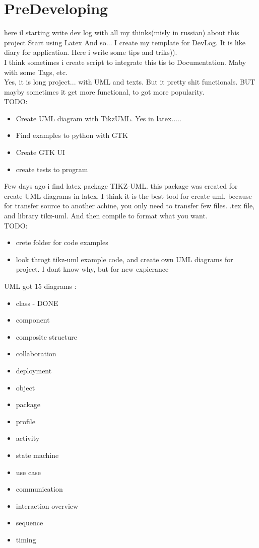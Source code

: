 \documentclass{article}
\begin{document}
\section{PreDeveloping}
\newpage
{}
here il starting write dev log with all my thinks(misly in russian) about this project
\newpage
{}
Start using Latex
And so... I create my template for DevLog. It is like diary for application. Here i write some tips and triks)).\\
I think sometimes i create script to integrate this tis to Documentation. Maby with some Tags, etc.\\
Yes, it is long project... with UML and texts. But it pretty shit functionals. BUT mayby sometimes it get more functional, to got more popularity.\\
TODO:
\begin{itemize}
  \item Create UML diagram with TikzUML. Yes in latex.....
  \item Find examples to python with GTK
  \item Create GTK UI
  \item create tests to program
\end{itemize}
\newpage
{}
Few days ago i find latex package TIKZ-UML. this package was created for create UML diagrams in latex. I think it is the best tool for create uml, because for transfer source to another achine, you only need to transfer few files. .tex file, and library tikz-uml. And then compile to format what you want.\\
TODO:
\begin{itemize}
  \item crete folder for code examples
  \item look throgt tikz-uml example code, and create own UML diagrams for project. I dont know why, but for new expierance
\end{itemize}
\newpage
{}
UML got 15 diagrams :\\
\begin{itemize}
  \item class - DONE
  \item component
  \item composite structure
  \item collaboration
  \item deployment
  \item object
  \item package 
  \item profile
  \item activity
  \item state machine
  \item use case
  \item communication
  \item interaction overview
  \item sequence
  \item timing
\end{itemize}
\end{document}
